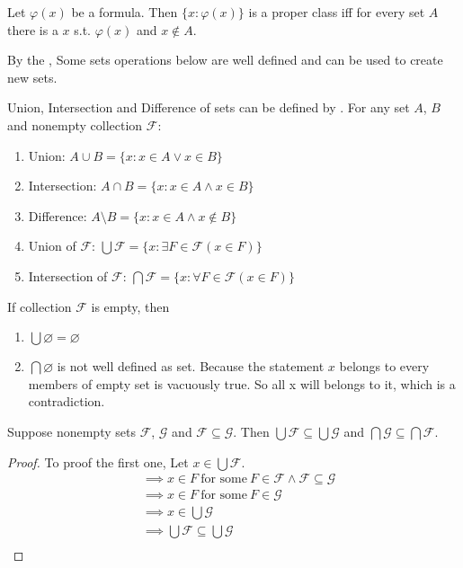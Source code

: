 \begin{corollary}{}{}
  Let $\varphi(x)$ be a formula. Then $\{x:\varphi(x)\}$ is a proper
  class iff for every set $A$ there is a $x$ s.t. $\varphi(x)$ and $x \notin A$.

\end{corollary}
By the , Some sets operations below are well defined and
can be used to create new sets.

\begin{corollary}{}{}
  Union, Intersection and Difference of sets can be defined by
  . For any set $A$, $B$ and nonempty collection $\mathcal{F}$:\\
  \begin{enumerate}
    \item Union: $A \cup B = \{x: x \in A \lor x \in B\} $
    \item Intersection: $A \cap B = \{x: x \in A \land x \in B\}$
    \item Difference: $A \setminus B = \{x: x \in A \land x \notin B\}$
    \item Union of $\mathcal{F}$: $\bigcup \mathcal{F} = \{x: \exists
      F \in \mathcal{F}(x\in F)\}$
    \item Intersection of $\mathcal{F}$: $\bigcap \mathcal{F} = \{x:
      \forall F \in \mathcal{F}(x\in F)\}$
  \end{enumerate}
\end{corollary}

\begin{remark}
  If collection $\mathcal{F}$ is empty, then\\
  \begin{enumerate}
    \item $\bigcup \varnothing = \varnothing$
    \item $\bigcap \varnothing$ is not well defined as set. Because
      the statement $x$ belongs to every members of empty set is
      vacuously true. So all x will belongs to it, which is a contradiction.
  \end{enumerate}
\end{remark}

\begin{theorem}{}{}
  Suppose nonempty sets $\mathcal{F}$, $\mathcal{G}$ and $\mathcal{F}
  \subseteq \mathcal{G}$. Then $\bigcup \mathcal{F} \subseteq \bigcup
  \mathcal{G}$ and $\bigcap \mathcal{G} \subseteq \bigcap \mathcal{F}$.
\end{theorem}

\begin{proof}
  To proof the first one, Let $x \in \bigcup \mathcal{F}$.
  \begin{align*}
    &\implies x \in F \ \text{for some}\ F \in \mathcal{F} \land
    \mathcal{F} \subseteq \mathcal{G} \\
    &\implies x \in F \ \text{for some}\ F \in \mathcal{G}\\
    &\implies x \in \bigcup \mathcal{G}\\
    &\implies \bigcup \mathcal{F} \subseteq \bigcup \mathcal{G}\\
  \end{align*}
\end{proof}

